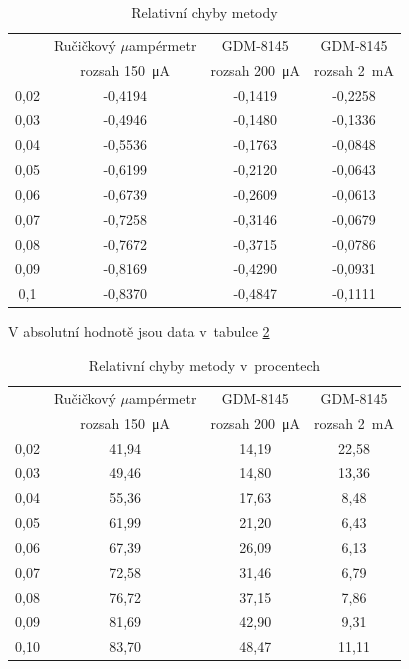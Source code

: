 \documentclass[a4paper,12pt]{article}   %
\newcommand{\tmu}{$\mu$}
\begin{document}
\begin{table}[h!]
    \centering
    \begin{tabular}{|c|c|c|c|}
        \hline
        \rule{0pt}{2.5ex}
        \multirow{2}{*}{Napětí na děliči} &Ručičkový \tmu ampérmetr	&GDM-8145 	&GDM-8145 \\[.7ex]
        & rozsah  150~μA & rozsah 200~μA & rozsah  2~mA \\\hline\hline
        0,02 & -0,4194 & -0,1419 & -0,2258 \\\hline
        0,03 & -0,4946 & -0,1480 & -0,1336 \\\hline 
        0,04 & -0,5536 & -0,1763 & -0,0848 \\\hline 
        0,05 & -0,6199 & -0,2120 & -0,0643 \\\hline
        0,06 & -0,6739 & -0,2609 & -0,0613 \\\hline
        0,07 & -0,7258 & -0,3146 & -0,0679 \\\hline
        0,08 & -0,7672 & -0,3715 & -0,0786 \\\hline
        0,09 & -0,8169 & -0,4290 & -0,0931 \\\hline
        0,1  & -0,8370 & -0,4847 & -0,1111 \\\hline
    \end{tabular}
    \caption{Relativní chyby metody}
    \label{tab:rel}
\end{table}
V absolutní hodnotě jsou data v~tabulce \ref{tab:rel_percent}
\begin{table}[h!]
    \centering
    \begin{tabular}{|c|c|c|c|}
        \hline
        \rule{0pt}{2.5ex}
        \multirow{2}{*}{Napětí na děliči} &Ručičkový \tmu ampérmetr	&GDM-8145 	&GDM-8145 \\[.7ex]
        & rozsah  150~μA & rozsah 200~μA & rozsah  2~mA \\\hline\hline
        0,02&41,94&14,19&22,58  \\\hline
        0,03&49,46&14,80&13,36  \\\hline
        0,04&55,36&17,63&8,48   \\\hline
        0,05&61,99&21,20&6,43   \\\hline
        0,06&67,39&26,09&6,13   \\\hline
        0,07&72,58&31,46&6,79   \\\hline
        0,08&76,72&37,15&7,86   \\\hline
        0,09&81,69&42,90&9,31   \\\hline
        0,10&83,70&48,47&11,11  \\\hline
    \end{tabular}
    \caption{Relativní chyby metody v~procentech}
    \label{tab:rel_percent}
\end{table}
\end{document}
